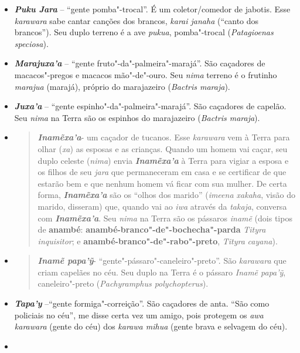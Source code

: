 \begin{itemize}
  de paca.
\item
  \emph{\textbf{Puku Jara}} -- ``gente pomba"-trocal''. É um
  coletor/comedor de jabotis. Esse \emph{karawara} sabe cantar canções
  dos brancos, \emph{karai janaha} (``canto dos brancos''). Seu duplo
  terreno é a ave \emph{pukua}, pomba"-trocal (\emph{Patagioenas
  speciosa}).
\item
  \emph{\textbf{Marajuxa'a}} -- ``gente fruto"-da"-palmeira"-marajá''. São
  caçadores de macacos"-pregos e macacos mão"-de"-ouro. Seu \emph{nima}
  terreno é o frutinho \emph{marajua} (marajá), próprio do marajazeiro
  (\emph{Bactris maraja}).
\item
  \emph{\textbf{Juxa'a}} -- ``gente espinho"-da"-palmeira"-marajá''. São
  caçadores de capelão. Seu \emph{nima} na Terra são os espinhos do
  marajazeiro (\emph{Bactris maraja}).
\item
  \begin{quote}
  \emph{\textbf{Inamẽxa'a}}- um caçador de tucanos. Esse \emph{karawara}
  vem à Terra para olhar (\emph{xa}) as esposas e as crianças. Quando um
  homem vai caçar, seu duplo celeste (\emph{nima}) envia
  \emph{\textbf{Inamẽxa'a}} à Terra para vigiar a esposa e os filhos de
  seu \emph{jara} que permaneceram em casa e se certificar de que
  estarão bem e que nenhum homem vá ficar com sua mulher. De certa
  forma, \emph{\textbf{Inamẽxa'a}} são os ``olhos dos marido''
  (\emph{imeena xakaha}, visão do marido, disseram) que, quando vai ao
  \emph{iwa} através da \emph{takaja}, conversa com
  \emph{\textbf{Inamẽxa'a}}. Seu \emph{nima} na Terra são os pássaros
  \emph{inamẽ} (dois tipos de \textbf{anambé}:
  \textbf{anambé-branco"-de"-bochecha"-parda} \emph{Tityra inquisitor}; e
  \textbf{anambé-branco"-de"-rabo"-preto}, \emph{Tityra} \emph{cayana}).
  \end{quote}
\item
  \begin{quote}
  \emph{\textbf{Inamẽ papa'ỹ}}- ``gente"-pássaro"-caneleiro"-preto''. São
  \emph{karawara} que criam capelães no céu. Seu duplo na Terra é o
  pássaro \emph{Inamẽ papa'ỹ}, caneleiro"-preto (\emph{Pachyramphus
  polychopterus}).
  \end{quote}
\item
  \emph{\textbf{Tapa'y}} --``gente formiga"-correição''. São caçadores de
  anta. ``São como policiais no céu'', me disse certa vez um amigo, pois
  protegem os \emph{awa} \emph{karawara} (gente do céu) dos \emph{karawa
  mihua} (gente brava e selvagem do céu).
\item

\end{itemize}
